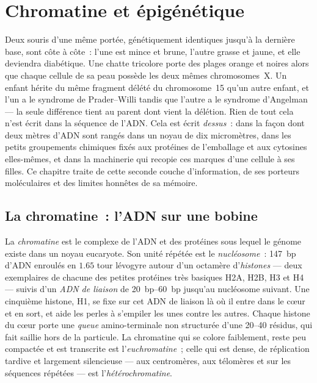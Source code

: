 \chapter{Chromatine et épigénétique}\label{ch:b3:chromatin-epigenetics}

Deux souris d'une même portée, génétiquement identiques jusqu'à la
dernière base, sont côte à côte~: l'une est mince et brune, l'autre
grasse et jaune, et elle deviendra diabétique. Une chatte tricolore
porte des plages orange et noires alors que chaque cellule de sa peau
possède les deux mêmes chromosomes~X. Un enfant hérite du même
fragment délété du chromosome~15 qu'un autre enfant, et l'un a le
syndrome de Prader--Willi tandis que l'autre a le syndrome d'Angelman
--- la seule différence tient au parent dont vient la délétion. Rien
de tout cela n'est écrit dans la séquence de l'ADN. Cela est écrit
\emph{dessus}~: dans la façon dont deux mètres d'ADN sont rangés dans
un noyau de dix micromètres, dans les petits groupements chimiques
fixés aux protéines de l'emballage et aux cytosines elles-mêmes, et
dans la machinerie qui recopie ces marques d'une cellule à ses filles.
Ce chapitre traite de cette seconde couche d'information, de ses
porteurs moléculaires et des limites honnêtes de sa mémoire.

\section{La chromatine~: l'ADN sur une bobine}

\begin{definition}\label{def:b3:chromatin-epigenetics:nucleosome}
La \emph{chromatine} est le complexe de l'ADN et des protéines sous
lequel le génome existe dans un noyau eucaryote. Son unité répétée est
le \emph{nucléosome}~: \qty{147}{bp} d'ADN enroulés en $1.65$ tour
lévogyre autour d'un octamère d'\emph{histones} --- deux exemplaires
de chacune des petites protéines très basiques H2A, H2B, H3 et H4 ---
suivis d'un \emph{ADN de liaison} de \qtyrange{20}{60}{bp} jusqu'au
nucléosome suivant. Une cinquième histone, H1, se fixe sur cet ADN de
liaison là où il entre dans le cœur et en sort, et aide les perles à
s'empiler les unes contre les autres. Chaque histone du cœur porte une
\emph{queue} amino-terminale non structurée d'une \numrange{20}{40}
résidus, qui fait saillie hors de la particule. La chromatine qui se
colore faiblement, reste peu compactée et est transcrite est
l'\emph{euchromatine}~; celle qui est dense, de réplication tardive et
largement silencieuse --- aux centromères, aux télomères et sur les
séquences répétées --- est l'\emph{hétérochromatine}.
\end{definition}

